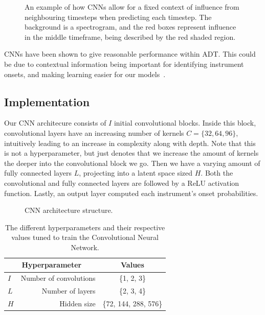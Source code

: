 \begin{figure}[H]
    \centering
    
    \caption{An example of how \glspl{CNN} allow for a fixed context of influence from neighbouring timesteps when predicting each timestep. The background is a spectrogram, and the red boxes represent influence in the middle timeframe, being described by the red shaded region.}
    \label{CNNInfluenceFigure}
\end{figure}

\glspl{CNN} have been shown to give reasonable performance within \gls{ADT}. This could be due to contextual information being important for identifying instrument onsets, and making learning easier for our models~\cite{Vogl2017DrumTV}.

\subsection{Implementation}

Our \gls{CNN} architecure consists of $I$ initial convolutional blocks. Inside this block, convolutional layers have an increasing number of kernels $C = \{32, 64, 96\}$, intuitively leading to an increase in complexity along with depth. Note that this is not a hyperparameter, but just denotes that we increase the amount of kernels the deeper into the convolutional block we go. Then we have a varying amount of fully connected layers $L$, projecting into a latent space sized $H$. Both the convolutional and fully connected layers are followed by a \gls{ReLU} activation function. Lastly, an output layer computed each instrument's onset probabilities.

\begin{figure}[H]
    \centering
    
    \caption{CNN architecture structure.}
    \label{CNNFigure}
\end{figure}

\begin{table}[H]
    \centering
    \begin{tabular}{lr|c}
        \multicolumn{2}{c|}{Hyperparameter} & Values       \\
        \hline
        $I$ & Number of convolutions & \{1, 2, 3\}\\
        $L$ & Number of layers      & \{2, 3, 4\} \\
        $H$ & Hidden size      & \{72, 144, 288, 576\} \\
    \end{tabular}
    \caption{The different hyperparameters and their respective values tuned to train the Convolutional Neural Network.}
    \label{CNNHyperparams}
\end{table}


